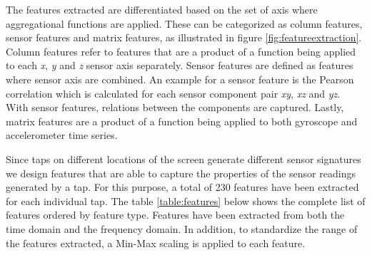 The features extracted are differentiated based on the set of axis where aggregational functions are applied. These can be categorized as column features, sensor features and matrix features, as illustrated in figure \ref{fig:featureextraction}. Column features refer to features that are a product of a function being applied to each \textit{x}, \textit{y} and \textit{z} sensor axis separately. Sensor features are defined as features where sensor axis are combined. An example for a sensor feature is the Pearson correlation which is calculated for each sensor component pair \textit{xy}, \textit{xz} and \textit{yz}. With sensor features, relations between the components are captured. Lastly, matrix features are a product of a function being applied to both gyroscope and accelerometer time series.

Since taps on different locations of the screen generate different sensor signatures we design features that are able to capture the properties of the sensor readings generated by a tap. For this purpose, a total of 230 features have been extracted for each individual tap. The table \ref{table:features} below shows the complete list of features ordered by feature type. Features have been extracted from both the time domain and the frequency domain. In addition, to standardize the range of the features extracted, a Min-Max scaling is applied to each feature.
\newpage

